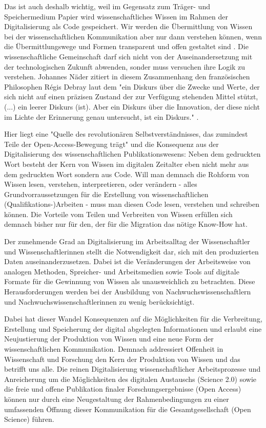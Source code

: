 Das ist auch deshalb wichtig, weil im Gegensatz zum Träger- und Speichermedium Papier wird wissenschaftliches Wissen im Rahmen der Digitalisierung als Code gespeichert. Wir werden die Übermittlung von Wissen bei der wissenschaftlichen Kommunikation aber nur dann verstehen können, wenn die Übermittlungswege und Formen transparent und offen gestaltet sind \cite{davis_2011_open}. Die wissenschaftliche Gemeinschaft darf sich nicht von der Auseinandersetzung mit der technologischen Zukunft abwenden, sonder muss versuchen ihre Logik zu verstehen. Johannes Näder zitiert in diesem Zusammenhang den französischen Philosophen Régis Debray laut dem "ein Diskurs über die Zwecke und Werte, der sich nicht auf einen präzisen Zustand der zur Verfügung stehenden Mittel stützt, (...) ein leerer Diskurs (ist). Aber ein Diskurs über die Innovation, der diese nicht im Lichte der Erinnerung genau untersucht, ist ein Diskurs." \cite[:117]{naeder_2010_open} \cite[:246]{debray2003einfuhrung}.

Hier liegt eine "Quelle des revolutionären Selbstverständnisses, das zumindest Teile der Open-Access-Bewegung trägt" und die Konsequenz aus der Digitalisierung des wissenschaftlichen Publikationswesens: Neben dem gedruckten Wort besteht der Kern von Wissen im digitalen Zeitalter eben nicht mehr aus dem gedruckten Wort sondern aus Code. Will man demnach die Rohform von Wissen lesen, verstehen, interpretieren, oder verändern - alles Grundvorraussetzungen für die Erstellung von wissenschaftlichen (Qualifikations-)Arbeiten - muss man diesen Code lesen, verstehen und schreiben können. Die Vorteile vom Teilen und Verbreiten von Wissen erfüllen sich demnach bisher nur für den, der für die Migration das nötige Know-How hat.

Der zunehmende Grad an Digitalisierung im Arbeitsalltag der Wissenschaftler und Wissenschaftlerinnen stellt die Notwendigkeit dar, sich mit den produzierten Daten auseinanderzusetzen. Dabei ist die Veränderungen der Arbeitsweise von analogen Methoden, Spreicher- und Arbeitsmedien sowie Tools auf digitale Formate für die Gewinnung von Wissen als unausweichlich zu betrachten. Diese Herausforderungen werden bei der Ausbildung von Nachwuchswissenschaftlern und Nachwuchswissenschaftlerinnen zu wenig berücksichtigt.

Dabei hat dieser Wandel Konsequenzen auf die Möglichkeiten für die Verbreitung, Erstellung und Speicherung der digital abgelegten Informationen und erlaubt eine Neujustierung der Produktion von Wissen und eine neue Form der wissenschaftlichen Kommunikation. Demnach addressiert Offenheit in Wissenschaft und Forschung den Kern der Produktion von Wissen und das betrifft uns alle. \cite{Mussell_2013} Die reinen Digitalisierung wissenschaftlicher Arbeitsprozesse und Anreicherung um die Möglichkeiten des digitalen Austauschs (Science 2.0) sowie die freie und offene Publikation finaler Forschungsergebnisse (Open Access) können nur durch eine Neugestaltung der Rahmenbedingungen zu einer umfassenden Öffnung dieser Kommunikation für die Gesamtgesellschaft (Open Science) führen.

